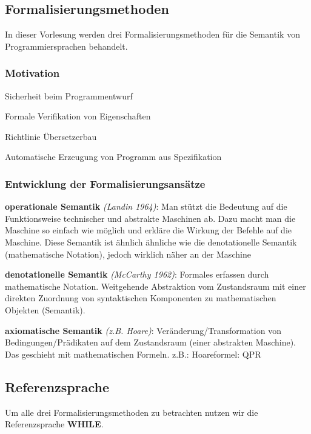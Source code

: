 \subsection{Formalisierungsmethoden}
In dieser Vorlesung werden drei Formalisierungsmethoden für die Semantik von Programmiersprachen behandelt.
\subsubsection*{Motivation}
\begin{compactitem}
	\item Sicherheit beim Programmentwurf
	\item Formale Verifikation von Eigenschaften
	\item Richtlinie Übersetzerbau
	\item Automatische Erzeugung von Programm aus Spezifikation
\end{compactitem}

\subsubsection*{Entwicklung der Formalisierungsansätze}
\begin{compactitem}
	\item [\textbf{operationale Semantik}] \emph{(Landin 1964)}:
	Man stützt die Bedeutung auf die Funktionsweise technischer und abstrakte Maschinen ab. Dazu macht man die Maschine so einfach wie möglich und erkläre die Wirkung der Befehle auf die Maschine. Diese Semantik ist ähnlich ähnliche wie die denotationelle Semantik (mathematische Notation), jedoch wirklich näher an der Maschine
	\item [\textbf{denotationelle Semantik}] \emph{(McCarthy 1962)}:
	Formales erfassen durch mathematische Notation. Weitgehende Abstraktion vom Zustandsraum mit einer direkten Zuordnung von syntaktischen Komponenten zu mathematischen Objekten (Semantik).
	\item [\textbf{axiomatische Semantik}] \emph{(z.B. Hoare)}:
	Veränderung/Transformation von Bedingungen/Prädikaten auf dem Zustandsraum (einer abstrakten Maschine).
	Das geschieht mit mathematischen Formeln. z.B.: Hoareformel: {Q}P{R}
\end{compactitem}

\subsection{Referenzsprache}
Um alle drei Formalisierungsmethoden zu betrachten nutzen wir die Referenzsprache \textbf{WHILE}.

